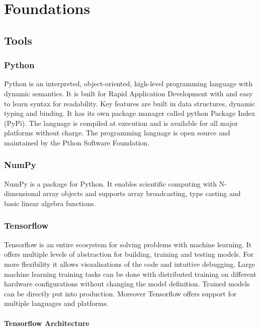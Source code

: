 \chapter{Foundations}

\section{Tools}

\subsection*{Python}

Python is an interpreted, object-oriented, high-level programming language with dynamic semantics.
It is built for Rapid Application Development with and easy to learn syntax for readability.
Key features are built in data structures, dynamic typing and binding.
\cite{python-lang}
It has its own package manager called python Package Index (PyPi).
The language is compiled at execution and is available for all major platforms without charge.
The programming language is open source and maintained by the Pthon Software Foundation.
\cite{python-software-foundation}


\subsection*{NumPy}

NumPy is a package for Python.
It enables scientific computing with N-dimensional array objects and supports array broadcasting, type casting and basic linear algebra functions.
\cite{numpy-package}


\subsection*{Tensorflow}

Tensorflow is an entire ecosystem for solving problems with machine learning.
It offers multiple levels of abstraction for building, training and testing models.
For more flexibility it allows visualisations of the code and intuitive debugging.
Large machine learning training tasks can be done with distributed training on different hardware configurations without changing the model definition.
Trained models can be directly put into production.
Moreover Tensorflow offers support for multiple languages and platforms.
\cite{tensorflow-about}

\subsubsection*{Tensorflow Architecture}

